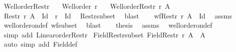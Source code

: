 \begin{isabellebody}
\endisatagproof
{\isafoldproof}%
%
\isadelimproof
\isanewline
%
\endisadelimproof
\isanewline
{}\isamarkupfalse%
\ Well{\isacharunderscore}{\kern0pt}order{\isacharunderscore}{\kern0pt}Restr{\isacharcolon}{\kern0pt}\isanewline
\ \ \ {\isachardoublequoteopen}Well{\isacharunderscore}{\kern0pt}order\ r{\isachardoublequoteclose}\isanewline
\ \ \ {\isachardoublequoteopen}Well{\isacharunderscore}{\kern0pt}order{\isacharparenleft}{\kern0pt}Restr\ r\ A{\isacharparenright}{\kern0pt}{\isachardoublequoteclose}\isanewline
%
\isadelimproof
%
\endisadelimproof
%
\isatagproof
{}\isamarkupfalse%
{\isacharminus}{\kern0pt}\isanewline
\ \ \isamarkupfalse%
\ {\isachardoublequoteopen}Restr\ r\ A\ {\isacharminus}{\kern0pt}\ Id\ {\isasymle}\ r\ {\isacharminus}{\kern0pt}\ Id{\isachardoublequoteclose}\ \isamarkupfalse%
\ Restr{\isacharunderscore}{\kern0pt}subset\ \isamarkupfalse%
\ blast\isanewline
\ \ \isamarkupfalse%
\ {\isachardoublequoteopen}wf{\isacharparenleft}{\kern0pt}Restr\ r\ A\ {\isacharminus}{\kern0pt}\ Id{\isacharparenright}{\kern0pt}{\isachardoublequoteclose}\ \isamarkupfalse%
\ assms\isanewline
\ \ \ \ \isamarkupfalse%
\ well{\isacharunderscore}{\kern0pt}order{\isacharunderscore}{\kern0pt}on{\isacharunderscore}{\kern0pt}def\ wf{\isacharunderscore}{\kern0pt}subset\ \isamarkupfalse%
\ blast\isanewline
\ \ \isamarkupfalse%
\ {\isacharquery}{\kern0pt}thesis\ \isamarkupfalse%
\ assms\ \isamarkupfalse%
\ well{\isacharunderscore}{\kern0pt}order{\isacharunderscore}{\kern0pt}on{\isacharunderscore}{\kern0pt}def\isanewline
\ \ \ \ \isamarkupfalse%
\ {\isacharparenleft}{\kern0pt}simp\ add{\isacharcolon}{\kern0pt}\ Linear{\isacharunderscore}{\kern0pt}order{\isacharunderscore}{\kern0pt}Restr{\isacharparenright}{\kern0pt}\isanewline
{}\isamarkupfalse%
%
\endisatagproof
{\isafoldproof}%
%
\isadelimproof
\isanewline
%
\endisadelimproof
\isanewline
{}\isamarkupfalse%
\ Field{\isacharunderscore}{\kern0pt}Restr{\isacharunderscore}{\kern0pt}subset{\isacharcolon}{\kern0pt}\ {\isachardoublequoteopen}Field{\isacharparenleft}{\kern0pt}Restr\ r\ A{\isacharparenright}{\kern0pt}\ {\isasymle}\ A{\isachardoublequoteclose}\isanewline
%
\isadelimproof
\ \ %
\endisadelimproof
%
\isatagproof
{}\isamarkupfalse%
\ {\isacharparenleft}{\kern0pt}auto\ simp\ add{\isacharcolon}{\kern0pt}\ Field{\isacharunderscore}{\kern0pt}def{\isacharparenright}{\kern0pt}%

\end{isabellebody}
